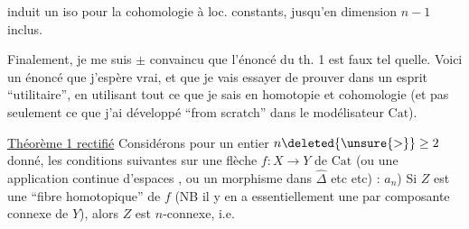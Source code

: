 induit un iso pour la cohomologie à  loc. constants, jusqu'en dimension $n-1$ inclus.

\deleted{\[
H^*(E(X)\unsure{,|)}
\]}

Finalement, je me suis $\pm$ convaincu que l'énoncé du th. 1 est faux tel quelle.
Voici un énoncé que j'espère vrai, et que je vais essayer de prouver dans un esprit ``utilitaire'', en utilisant tout ce que je sais en homotopie et cohomologie (et pas seulement ce que j'ai développé ``from scratch'' dans le modélisateur $\mathrm{Cat}$).

\uline{Théorème 1 rectifié} Considérons pour un entier $n\deleted{\unsure{>}}\geq2$ donné, les conditions suivantes sur une flèche $f:X\to Y$ de $\mathrm{Cat}$ (ou une application continue d'espaces ,  ou un morphisme dans $\widehat{\Delta}$ etc etc) :
 $a_n$) Si $Z$ est une ``fibre homotopique'' de $f$ (NB il y en a essentiellement une par composante connexe de $Y$), alors  $Z$ est $n$-connexe, i.e.
